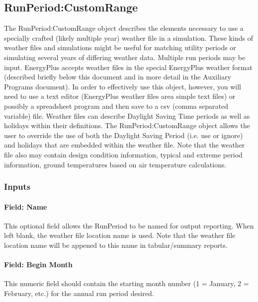 \subsection{RunPeriod:CustomRange}\label{runperiodcustomrange}

The RunPeriod:CustomRange object describes the elements necessary to use a specially crafted (likely multiple year) weather file in a simulation. These kinds of weather files and simulations might be useful for matching utility periods or simulating several years of differing weather data. Multiple run periods may be input. EnergyPlus accepts weather files in the special EnergyPlus weather format (described briefly below this document and in more detail in the Auxiliary Programs document). In order to effectively use this object, however, you will need to use a text editor (EnergyPlus weather files area simple text files) or possibly a spreadsheet program and then save to a csv (comma separated variable) file. Weather files can describe Daylight Saving Time periods as well as holidays within their definitions. The RunPeriod:CustomRange object allows the user to override the use of both the Daylight Saving Period (i.e. use or ignore) and holidays that are embedded within the weather file. Note that the weather file also may contain design condition information, typical and extreme period information, ground temperatures based on air temperature calculations.

\subsubsection{Inputs}\label{inputs-5-016}

\paragraph{Field: Name}\label{field-name-5-012}

This optional field allows the RunPeriod to be named for output reporting. When left blank, the weather file location name is used. Note that the weather file location name will be appened to this name in tabular/summary reports.

\paragraph{Field: Begin Month}\label{field-begin-month-2}

This numeric field should contain the starting month number (1 = January, 2 = February, etc.) for the annual run period desired.

